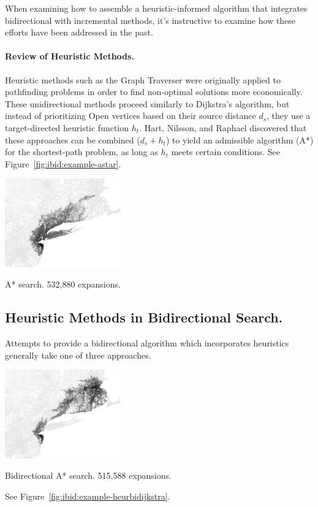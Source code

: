 When examining how to assemble a heuristic-informed algorithm
that integrates bidirectional with incremental methods,
it's instructive to examine how these efforts have been addressed
in the past.

\paragraph{Review of Heuristic Methods.}
Heuristic methods such as the Graph Traverser
\citep{doran1966graphtraverser} were originally
applied to pathfinding problems in order to find non-optimal
solutions more economically.
These unidirectional methods proceed similarly to Dijkstra's algorithm,
but instead of prioritizing {\sc Open} vertices
based on their source distance $d_s$,
they use a target-directed heuristic function $h_t$.
Hart, Nilsson, and Raphael \citep{hart1968astar} discovered that
these approaches can be combined ($d_s + h_t$) to yield
an admissible algorithm (A*) for the shortest-path problem,
as long as $h_t$ meets certain conditions.
See Figure~\ref{fig:ibid:example-astar}.

\begin{marginfigure}%
   \centering%
   \includegraphics[width=5cm]{figs/incbi-road-ne/singleshot/example-astar.png}%
   \caption{A* search.
      532,880 expansions.}%
   \label{fig:ibid:example-astar}%
\end{marginfigure}

\subsection{Heuristic Methods in Bidirectional Search.}

Attempts to provide a bidirectional algorithm which incorporates
heuristics generally take one of three approaches.

\begin{marginfigure}%
   \centering%
   \includegraphics[width=5cm]{figs/incbi-road-ne/singleshot/example-heurbidijkstra.png}%
   \caption{Bidirectional A* search.
      515,588 expansions.}%
   \label{fig:ibid:example-heurbidijkstra}%
\end{marginfigure}
See Figure~\ref{fig:ibid:example-heurbidijkstra}.

